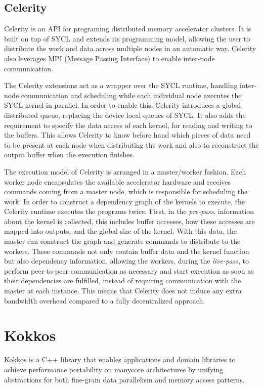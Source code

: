 \subsection{Celerity}
Celerity \cite{celerity} is an API for programing distributed memory accelerator clusters. It is built on top of SYCL and extends its programming model, allowing the user to distribute the work and data across multiple nodes in an automatic way. Celerity also leverages MPI (Message Passing Interface) \cite{mpi} to enable inter-node communication.

The Celerity extensions act as a wrapper over the SYCL runtime, handling inter-node communication and scheduling while each individual node executes the SYCL kernel in parallel. In order to enable this, Celerity introduces a global distributed queue, replacing the device local queues of SYCL. It also adds the requirement to specify the data access of each kernel, for reading and writing to the buffers. This allows Celerity to know before hand which pieces of data need to be present at each node when distributing the work and also to reconstruct the output buffer when the execution finishes.

The execution model of Celerity is arranged in a master/worker fashion. Each worker node encapsulates the available accelerator hardware and receives commands coming from a master node, which is responsible for scheduling the work. In order to construct a dependency graph of the kernels to execute, the Celerity runtime executes the programs twice. First, in the \textit{pre-pass}, information about the kernel is collected, this includes buffer accesses, how these accesses are mapped into outputs, and the global size of the kernel. With this data, the master can construct the graph and generate commands to distribute to the workers. These commands not only contain buffer data and the kernel function but also dependency information, allowing the workers, during the \textit{live-pass}, to perform peer-to-peer communication as necessary and start execution as soon as their dependencies are fulfilled, instead of requiring communication with the master at each instance. This means that Celerity does not induce any extra bandwidth overhead compared to a fully decentralized approach.

\section{Kokkos}
Kokkos \cite{kokkos} is a C++ library that enables applications and domain libraries to achieve performance portability on manycore architectures by unifying abstractions for both fine-grain data parallelism and memory access patterns.

